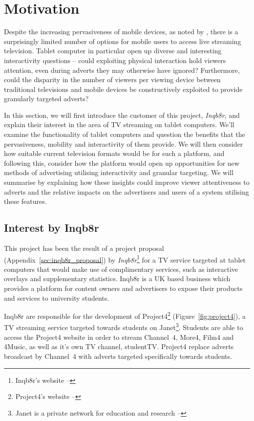 \section{Motivation}

Despite the increasing pervasiveness of mobile devices, as noted by \citet{socialTV}, there is a surprisingly limited number of options for mobile users to access live streaming television. Tablet computer in particular open up diverse and interesting interactivity questions -- could exploiting physical interaction hold viewers attention, even during adverts they may otherwise have ignored? Furthermore, could the disparity in the number of viewers per viewing device between traditional televisions and mobile devices be constructively exploited to provide granularly targeted adverts?

In this section, we will first introduce the customer of this project, \textit{Inqb8r}, and explain their interest in the area of TV streaming on tablet computers. We'll examine the functionality of tablet computers and question the benefits that the pervasiveness, mobility and interactivity of them provide. We will then consider how suitable current television formats would be for such a platform, and following this, consider how the platform would open up opportunities for new methods of advertising utilising interactivity and granular targeting. We will summarise by explaining how these insights could improve viewer attentiveness to adverts and the relative impacts on the advertisers and users of a system utilising these features.

\subsection{Interest by Inqb8r}

	This project has been the result of a project proposal (Appendix~\ref{sec:inqb8r_proposal}) by \textit{Inqb8r}\footnote{Inqb8r's website -- } for a TV service targeted at tablet computers that would make use of complimentary services, such as interactive overlays and supplementary statistics. Inqb8r is a UK based business which provides a platform for content owners and advertisers to expose their products and services to university students.

	Inqb8r are responsible for the development of Project4\footnote{Project4's website -- } (Figure~\ref{fig:project4}), a TV streaming service targeted towards students on Janet\footnote{Janet is a private network for education and research -- }. Students are able to access the Project4 website in order to stream Channel~4, More4, Film4 and 4Music, as well as it's own TV channel, studentTV. Project4 replace adverts broadcast by Channel~4 with adverts targeted specifically towards students.
	
